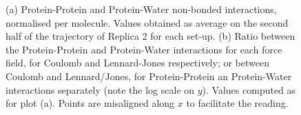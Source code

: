 \begin{figure}[h!]
\centering
\vspace{3cm}
\caption[(SI) Replica 2: Non-bonded protein energy contribution to capsule structures]{(a) Protein-Protein and Protein-Water non-bonded interactions, normalised per molecule. Values obtained as average on the second half of the trajectory of Replica 2 for each set-up. (b) Ratio between the Protein-Protein and Protein-Water interactions for each force field, for Coulomb and Lennard-Jones respectively; or between Coulomb and Lennard/Jones, for Protein-Protein an Protein-Water interactions separately (note the log scale on $y$). Values computed as for plot (a). Points are misaligned along $x$ to facilitate the reading.}
\label{fig:eng_cg2}
\vspace{3cm}
\end{figure}


